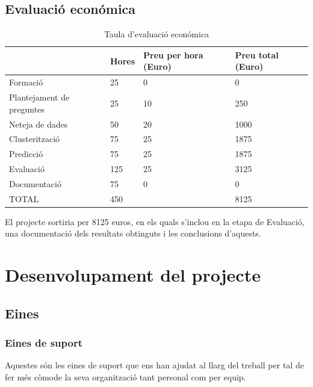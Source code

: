 \documentclass[12pt,a4paper,catalan]{article}
\begin{document}
\newpage

\subsection{Evaluació económica}



\begin{table}[h]
\centering

\begin{tabular}{@{}llll@{}}
\toprule
                & Hores & Preu per hora (Euro) & Preu total (Euro) \\ \midrule
Formació        & 25    & 0                 & 0              \\
Plantejament de preguntes       & 25    & 10                & 250            \\
Neteja de dades & 50    & 20                & 1000           \\
Clusterització  & 75    & 25                & 1875           \\
Predicció       & 75    & 25                & 1875           \\
Evaluació       & 125   & 25                & 3125           \\
Documentació    & 75    & 0                 & 0              \\ \midrule
TOTAL           & 450   &                   & 8125           \\ \bottomrule
\end{tabular}
\caption{Taula d'evaluació económica}
\end{table}

El projecte sortiria per 8125 euros, en els quals s'inclou en la etapa de Evaluació, una documentació dels resultats obtinguts i les conclusions d'aquests.

\newpage

\section{Desenvolupament del projecte}
\subsection{Eines}
\subsubsection{Eines de suport}
Aquestes són les eines de suport que ens han ajudat al llarg del treball per tal de fer més còmode la seva organització tant personal com per equip.
\end{document}
